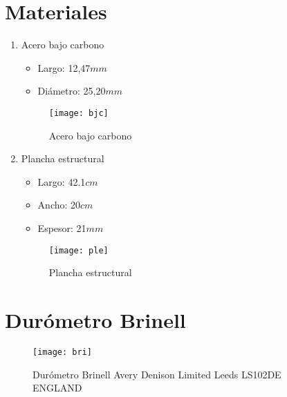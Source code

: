 \documentclass[a4paper,12pt]{report}
\begin{document}
\section{Materiales}
\begin{enumerate}
\item Acero bajo carbono
\begin{itemize}
\item Largo: 12,47$mm$
\item Diámetro: 25,20$mm$
\end{itemize}
\begin{figure}[H]
\begin{center}
\texttt{[image: bjc]}
\caption{Acero bajo carbono}
\end{center}
\end{figure}
\item Plancha estructural
\begin{itemize}
\item Largo: 42.1$cm$
\item Ancho: 20$cm$
\item Espesor: 21$mm$
\end{itemize}
\begin{figure}[H]
\begin{center}
\texttt{[image: ple]}
\caption{Plancha estructural}
\end{center}
\end{figure}
\end{enumerate}
\section{Durómetro Brinell}
\begin{figure}[H]
\begin{center}
\texttt{[image: bri]}
\caption[Durómetro Brinell]{Durómetro Brinell Avery Denison Limited Leeds LS102DE ENGLAND}
\end{center}
\end{figure}
\end{document}
